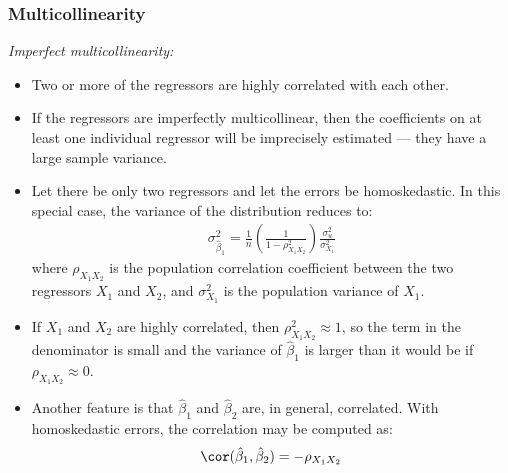 \begin{frame}
\frametitle{Multicollinearity}
\emph{Imperfect multicollinearity:}
\begin{itemize}
\item Two or more of the regressors are highly correlated with each other.
\item If the regressors are imperfectly multicollinear, then the coefficients on at least one individual regressor will be imprecisely estimated --- they have a large sample variance.
\item Let there be only two regressors and let the errors be homoskedastic. In this special case, the variance of the distribution reduces to:
\begin{align*}
\sigma_{\hat{\beta}_{1}}^{2} 
    = \frac{1}{n} \left(\frac{1}{1-\rho_{X_{1}X_{2}}^{2}}\right) \frac{\sigma_{u}^{2}}{\sigma_{X_{1}}^{2}}
\end{align*}
where $\rho_{X_{1}X_{2}}$ is the population correlation coefficient between the two regressors $X_{1}$ and $X_{2}$, and $\sigma_{X_{1}}^{2}$ is the population variance of $X_{1}$.
\item If $X_{1}$ and $X_{2}$ are highly correlated, then $\rho_{X_{1}X_{2}}^{2}\approx1$, so the term in the denominator is small and the variance of $\hat{\beta}_{1}$ is larger than it would be if $\rho_{X_{1}X_{2}}\approx0$.
\item Another feature is that $\hat{\beta}_{1}$ and $\hat{\beta}_{2}$ are, in general, correlated. With homoskedastic errors, the correlation may be computed as:
\begin{align*}
\cor(\hat{\beta}_{1}, \hat{\beta}_{2})
    = -\rho_{X_{1}X_{2}}
\end{align*}
\end{itemize}
\end{frame}

